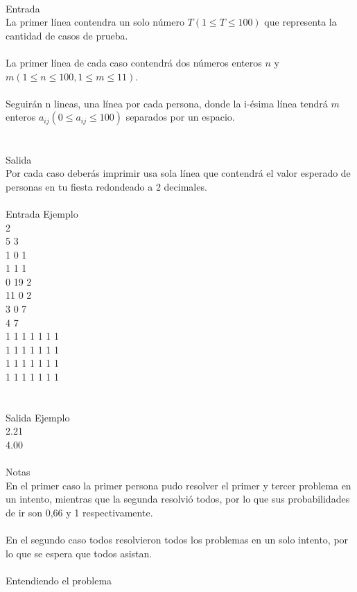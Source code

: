 \documentclass[12pt]{article}
\begin{document}
{{{\\
\textrm{\large Entrada}
\\
La primer línea contendra un solo número $T (1 ≤ T ≤ 100)$ que representa la cantidad de casos de prueba.\\
\\La primer línea de cada caso contendrá dos números enteros $n$ y $m (1 ≤ n ≤ 100 , 1 ≤ m ≤ 11)$.\\
\\Seguirán n lineas, una línea por cada persona, donde la i-ésima línea tendrá $m$ enteros $a_{ij} (0 ≤ a_{ij} ≤ 100)$ separados por un espacio.\\
\\
\\
\textrm{\large Salida}
\\
Por cada caso deberás imprimir usa sola línea que contendrá el valor esperado de personas en tu fiesta redondeado a 2 decimales.
\\
\\
\textrm{\large Entrada Ejemplo}
\\
2\\
5 3\\
1 0 1\\
1 1 1\\
0 19 2\\
11 0 2\\
3 0 7\\
4 7\\
1 1 1 1 1 1 1\\
1 1 1 1 1 1 1\\
1 1 1 1 1 1 1\\
1 1 1 1 1 1 1\\
\\
\\
\textrm{\large Salida Ejemplo}
\\
2.21\\
4.00\\
\\Notas
\\En el primer caso la primer persona pudo resolver el primer y tercer problema en un intento, mientras que la segunda resolvió todos, por lo que sus probabilidades de ir son 0,66 y 1 respectivamente.\\
\\En el segundo caso todos resolvieron todos los problemas en un solo intento, por lo que se espera que todos asistan.\\
\\
\textrm{\large Entendiendo el problema}\\
}}}
\end{document}
